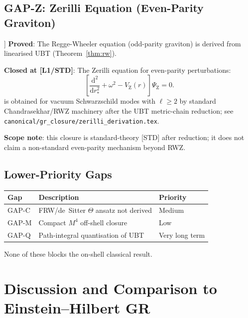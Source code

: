 \documentclass[12pt,a4paper]{article}
\theoremstyle{definition}
\theoremstyle{remark}
\begin{document}
\subsection{GAP-Z: Zerilli Equation (Even-Parity Graviton)}
\label{sec:gapz}

\begin{tcolorbox}[colback=green!4!white,colframe=green!45!black,
  title=GAP-Z: Zerilli Equation\ CLOSED\ [L1/STD]]
\textbf{Proved}: The Regge-Wheeler equation (odd-parity graviton) is derived
from linearised UBT (Theorem~\ref{thm:rw}).

\smallskip
\textbf{Closed at [L1/STD]}: The Zerilli equation for even-parity perturbations:
\[
  \left[\frac{\mathrm{d}^2}{\mathrm{d}r_*^2} + \omega^2 - V_\mathrm{Z}(r)\right]
  \Psi_\mathrm{Z} = 0.
\]
is obtained for vacuum Schwarzschild modes with $\ell \ge 2$ by
standard Chandrasekhar/RWZ machinery after the UBT metric-chain reduction;
see \texttt{canonical/gr\_closure/zerilli\_derivation.tex}.

\textbf{Scope note}: this closure is standard-theory [STD] after reduction;
it does not claim a non-standard even-parity mechanism beyond RWZ.
\end{tcolorbox}

\subsection{Lower-Priority Gaps}

\begin{center}
\begin{tabular}{lll}
\toprule
\textbf{Gap} & \textbf{Description} & \textbf{Priority} \\
\midrule
GAP-C & FRW/de~Sitter $\Theta$ ansatz not derived & Medium \\
GAP-M & Compact $M^4$ off-shell closure & Low \\
GAP-Q & Path-integral quantisation of UBT & Very long term \\
\bottomrule
\end{tabular}
\end{center}

None of these blocks the on-shell classical result.

\section{Discussion and Comparison to Einstein--Hilbert GR}
\label{sec:discussion}
\end{document}
